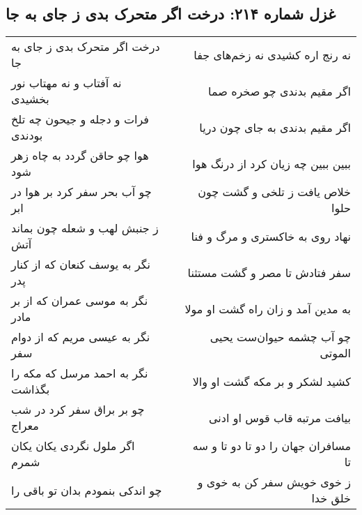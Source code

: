 \begin{center}
\section*{غزل شماره ۲۱۴: درخت اگر متحرک بدی ز جای به جا}
\label{sec:0214}
\begin{longtable}{l p{0.5cm} r}
درخت اگر متحرک بدی ز جای به جا
&&
نه رنج اره کشیدی نه زخم‌های جفا
\\
نه آفتاب و نه مهتاب نور بخشیدی
&&
اگر مقیم بدندی چو صخره صما
\\
فرات و دجله و جیحون چه تلخ بودندی
&&
اگر مقیم بدندی به جای چون دریا
\\
هوا چو حاقن گردد به چاه زهر شود
&&
ببین ببین چه زیان کرد از درنگ هوا
\\
چو آب بحر سفر کرد بر هوا در ابر
&&
خلاص یافت ز تلخی و گشت چون حلوا
\\
ز جنبش لهب و شعله چون بماند آتش
&&
نهاد روی به خاکستری و مرگ و فنا
\\
نگر به یوسف کنعان که از کنار پدر
&&
سفر فتادش تا مصر و گشت مستثنا
\\
نگر به موسی عمران که از بر مادر
&&
به مدین آمد و زان راه گشت او مولا
\\
نگر به عیسی مریم که از دوام سفر
&&
چو آب چشمه حیوان‌ست یحیی الموتی
\\
نگر به احمد مرسل که مکه را بگذاشت
&&
کشید لشکر و بر مکه گشت او والا
\\
چو بر براق سفر کرد در شب معراج
&&
بیافت مرتبه قاب قوس او ادنی
\\
اگر ملول نگردی یکان یکان شمرم
&&
مسافران جهان را دو تا دو تا و سه تا
\\
چو اندکی بنمودم بدان تو باقی را
&&
ز خوی خویش سفر کن به خوی و خلق خدا
\\
\end{longtable}
\end{center}
